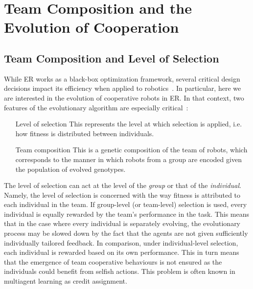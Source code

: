 

\section{Team Composition and the Evolution of Cooperation}

  \subsection{Team Composition and Level of Selection}

    While ER works as a black-box optimization framework, several critical design decisions impact its efficiency when applied to robotics~\parencite{Trianni2014b}. In particular, here we are interested in the evolution of cooperative robots in ER. In that context, two features of the evolutionary algorithm are especially critical~\parencite{Waibel2009, Lichocki2013}:

    \begin{itemize}
      \item [Level of selection] {This represents the level at which selection is applied, i.e. how fitness is distributed between individuals.}

      \item [Team composition] {This is a genetic composition of the team of robots, which corresponds to the manner in which robots from a group are encoded given the population of evolved genotypes.}
    \end{itemize}

    The level of selection can act at the level of the \emph{group} or that of the \emph{individual}. Namely, the level of selection is concerned with the way fitness is attributed to each individual in the team. If group-level (or team-level) selection is used, every individual is equally rewarded by the team's performance in the task. This means that in the case where every individual is separately evolving, the evolutionary process may be slowed down by the fact that the agents are not given sufficiently individually tailored feedback. In comparison, under individual-level selection, each individual is rewarded based on its own performance. This in turn means that the emergence of team cooperative behaviours is not ensured as the individuals could benefit from selfish actions. This problem is often known in multiagent learning as credit assignment.

